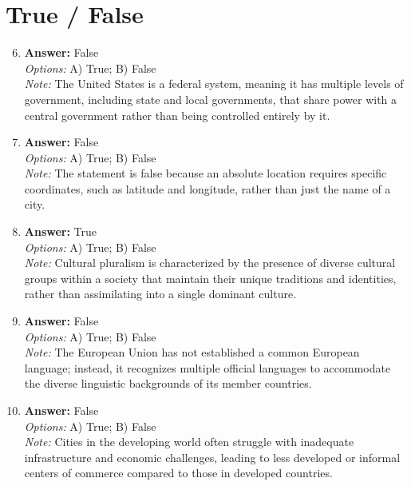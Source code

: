 \documentclass[12pt]{article}
\begin{document}
\section*{True / False}
\begin{enumerate}[label=\arabic*.]
\setcounter{enumi}{5}
\item \textbf{Answer:} False
\\ \textit{Options:} A) True; B) False
\\ \textit{Note:} The United States is a federal system, meaning it has multiple levels of government, including state and local governments, that share power with a central government rather than being controlled entirely by it.
\item \textbf{Answer:} False
\\ \textit{Options:} A) True; B) False
\\ \textit{Note:} The statement is false because an absolute location requires specific coordinates, such as latitude and longitude, rather than just the name of a city.
\item \textbf{Answer:} True
\\ \textit{Options:} A) True; B) False
\\ \textit{Note:} Cultural pluralism is characterized by the presence of diverse cultural groups within a society that maintain their unique traditions and identities, rather than assimilating into a single dominant culture.
\item \textbf{Answer:} False
\\ \textit{Options:} A) True; B) False
\\ \textit{Note:} The European Union has not established a common European language; instead, it recognizes multiple official languages to accommodate the diverse linguistic backgrounds of its member countries.
\item \textbf{Answer:} False
\\ \textit{Options:} A) True; B) False
\\ \textit{Note:} Cities in the developing world often struggle with inadequate infrastructure and economic challenges, leading to less developed or informal centers of commerce compared to those in developed countries.
\end{enumerate}
\end{document}
